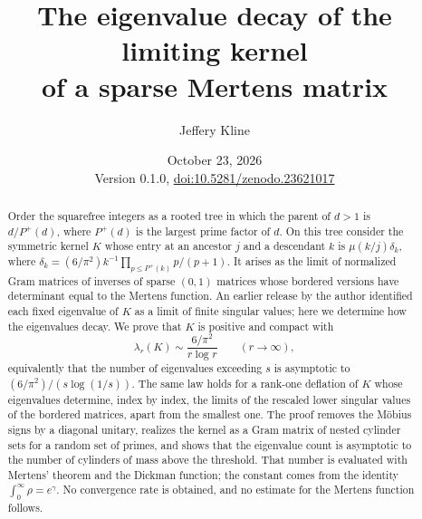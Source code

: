 \documentclass[11pt]{article}
\title{The eigenvalue decay of the limiting kernel\\
of a sparse Mertens matrix}
\author{Jeffery Kline}
\date{October 23, 2026\\[3pt]\small Version 0.1.0, \href{https://doi.org/10.5281/zenodo.23621017}{doi:10.5281/zenodo.23621017}}
\theoremstyle{definition}
\theoremstyle{remark}
\begin{document}
\maketitle
\begin{abstract}
Order the squarefree integers as a rooted tree in which the parent of
$d>1$ is $d/P^+(d)$, where $P^+(d)$ is the largest prime factor of $d$.
On this tree consider the symmetric kernel $K$ whose entry at an ancestor
$j$ and a descendant $k$ is $\mu(k/j)\delta_k$, where
$\delta_k=(6/\pi^2)k^{-1}\prod_{p\le P^+(k)}p/(p+1)$. It arises as the
limit of normalized Gram matrices of inverses of sparse $(0,1)$ matrices
whose bordered versions have determinant equal to the Mertens function.
An earlier release by the author identified each fixed eigenvalue of $K$
as a limit of finite singular values; here we determine how the
eigenvalues decay. We prove that $K$ is positive and compact with
\[
 \lambda_r(K)\sim\frac{6/\pi^2}{r\log r}\qquad(r\to\infty),
\]
equivalently that the number of eigenvalues exceeding $s$ is asymptotic
to $(6/\pi^2)/(s\log(1/s))$. The same law holds for a rank-one deflation
of $K$ whose eigenvalues determine, index by index, the limits of the
rescaled lower singular values of the bordered matrices, apart from the
smallest one.
The proof removes the M\"obius signs by a diagonal unitary, realizes the
kernel as a Gram matrix of nested cylinder sets for a random set of
primes, and shows that the eigenvalue count is asymptotic to the number
of cylinders of mass above the threshold. That number is evaluated with
Mertens' theorem and the Dickman function; the constant comes from the
identity $\int_0^\infty\rho=e^\gamma$. No convergence rate is obtained,
and no estimate for the Mertens function follows.
\end{abstract}
\tableofcontents







\appendix



\end{document}
